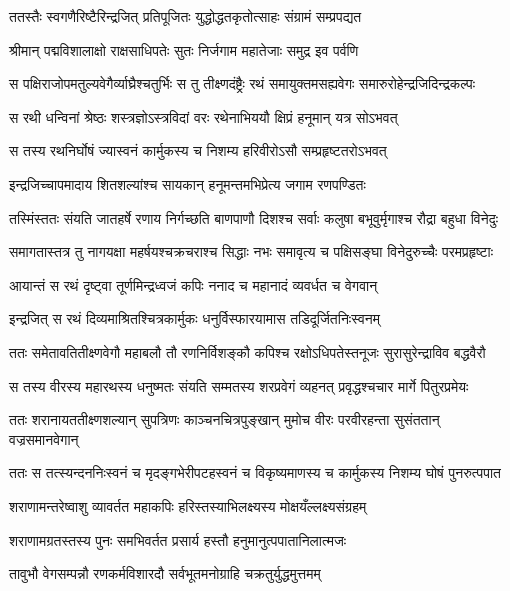 \twolineshloka
{ततस्तैः स्वगणैरिष्टैरिन्द्रजित् प्रतिपूजितः}
{युद्धोद्धतकृतोत्साहः संग्रामं सम्प्रपद्यत} %

\twolineshloka
{श्रीमान् पद्मविशालाक्षो राक्षसाधिपतेः सुतः}
{निर्जगाम महातेजाः समुद्र इव पर्वणि} %

\twolineshloka
{स पक्षिराजोपमतुल्यवेगैर्व्याघ्रैश्चतुर्भिः स तु तीक्ष्णदंष्ट्रैः}
{रथं समायुक्तमसह्यवेगः समारुरोहेन्द्रजिदिन्द्रकल्पः} %

\twolineshloka
{स रथी धन्विनां श्रेष्ठः शस्त्रज्ञोऽस्त्रविदां वरः}
{रथेनाभिययौ क्षिप्रं हनूमान् यत्र सोऽभवत्} %

\twolineshloka
{स तस्य रथनिर्घोषं ज्यास्वनं कार्मुकस्य च}
{निशम्य हरिवीरोऽसौ सम्प्रहृष्टतरोऽभवत्} %

\twolineshloka
{इन्द्रजिच्चापमादाय शितशल्यांश्च सायकान्}
{हनूमन्तमभिप्रेत्य जगाम रणपण्डितः} %

\twolineshloka
{तस्मिंस्ततः संयति जातहर्षे रणाय निर्गच्छति बाणपाणौ}
{दिशश्च सर्वाः कलुषा बभूवुर्मृगाश्च रौद्रा बहुधा विनेदुः} %

\twolineshloka
{समागतास्तत्र तु नागयक्षा महर्षयश्चक्रचराश्च सिद्धाः}
{नभः समावृत्य च पक्षिसङ्घा विनेदुरुच्चैः परमप्रहृष्टाः} %

\twolineshloka
{आयान्तं स रथं दृष्ट्वा तूर्णमिन्द्रध्वजं कपिः}
{ननाद च महानादं व्यवर्धत च वेगवान्} %

\twolineshloka
{इन्द्रजित् स रथं दिव्यमाश्रितश्चित्रकार्मुकः}
{धनुर्विस्फारयामास तडिदूर्जितनिःस्वनम्} %

\twolineshloka
{ततः समेतावतितीक्ष्णवेगौ महाबलौ तौ रणनिर्विशङ्कौ}
{कपिश्च रक्षोऽधिपतेस्तनूजः सुरासुरेन्द्राविव बद्धवैरौ} %

\twolineshloka
{स तस्य वीरस्य महारथस्य धनुष्मतः संयति सम्मतस्य}
{शरप्रवेगं व्यहनत् प्रवृद्धश्चचार मार्गे पितुरप्रमेयः} %

\twolineshloka
{ततः शरानायततीक्ष्णशल्यान् सुपत्रिणः काञ्चनचित्रपुङ्खान्}
{मुमोच वीरः परवीरहन्ता सुसंततान् वज्रसमानवेगान्} %

\twolineshloka
{ततः स तत्स्यन्दननिःस्वनं च मृदङ्गभेरीपटहस्वनं च}
{विकृष्यमाणस्य च कार्मुकस्य निशम्य घोषं पुनरुत्पपात} %

\twolineshloka
{शराणामन्तरेष्वाशु व्यावर्तत महाकपिः}
{हरिस्तस्याभिलक्ष्यस्य मोक्षयँल्लक्ष्यसंग्रहम्} %

\twolineshloka
{शराणामग्रतस्तस्य पुनः समभिवर्तत}
{प्रसार्य हस्तौ हनुमानुत्पपातानिलात्मजः} %

\twolineshloka
{तावुभौ वेगसम्पन्नौ रणकर्मविशारदौ}
{सर्वभूतमनोग्राहि चक्रतुर्युद्धमुत्तमम्} %

